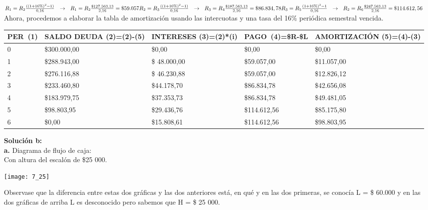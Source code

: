 $	R_{1}=R_{2}  \frac{((1+16\%)^{2}-1)}{0,16} \ \ \rightarrow \ \ R_{1}=R_{2}  \frac{\$127.563,13}{2,16}=\$59.057\\
	R_{2}=R_{3}  \frac{((1+16\%)^{2}-1)}{0,16} \ \ \rightarrow \ \ R_{3}=R_{4}  \frac{\$187.563, 13}{2,16}=\$86.834,78\\
	R_{3}=R_{5}  \frac{(1+16\%)^{2}-1}{0,16} \ \ \rightarrow \ \ R_{2}=R_{6}  \frac{\$247.563,13}{2,16}=\$114.612,56$\\
	

Ahora, procedemos a elaborar la tabla de amortización usando las intercuotas y una tasa del 16\% periódica semestral vencida.

\begin{spacing}{1.1}
    \begin{center}
        \begin{tabular}{|p{1cm}|p{2cm}|p{2cm}|p{2cm}|p{3cm}|}
        \hline 
        \rowcolor{white!50}
            \textbf{PER\ (1)} & \textbf{SALDO DEUDA (2)=(2)-(5)} & \textbf{INTERESES  (3)=(2)*(i)}& \textbf{PAGO\ (4)=\$R-\$L }& \textbf{AMORTIZACIÓN  (5)=(4)-(3)} \\ \hline                        

            0 & \$300.000,00 & \$0,00 & \$0,00 & \$0,00 \\ \hline 
            1 & \$288.943,00  &\$ 48.000,00  & \$59.057,00  & \$11.057,00 \\ \hline
            2 & \$276.116,88  &\$ 46.230,88  & \$59.057,00  & \$12.826,12 \\ \hline
            3 & \$233.460,80 & \$44.178,70  & \$86.834,78 & \$42.656,08 \\ \hline
            4 & \$183.979,75  & \$37.353,73  & \$86.834,78  & \$49.481,05\\ \hline
            5 & \$98.803,95  & \$29.436,76  & \$114.612,56  & \$85.175,80 \\ \hline
            6 & \$0,00  & \$15.808,61  & \$114.612,56  & \$98.803,95 \\ \hline

 
\end{tabular}
\end{center}
\end{spacing}


\textbf{Solución b:}\\
\textbf{a.}	Diagrama de flujo de caja:\\
Con altura del escalón de \$25 000.
\begin{center}
	\texttt{[image: 7\_25]}
\end{center}
Observase que la diferencia entre estas dos gráficas y las dos anteriores está, en qué y en  las dos primeras, se conocía L = \$ 60.000 y en las dos gráficas de arriba L es desconocido pero sabemos que H = \$ 25 000.\\

